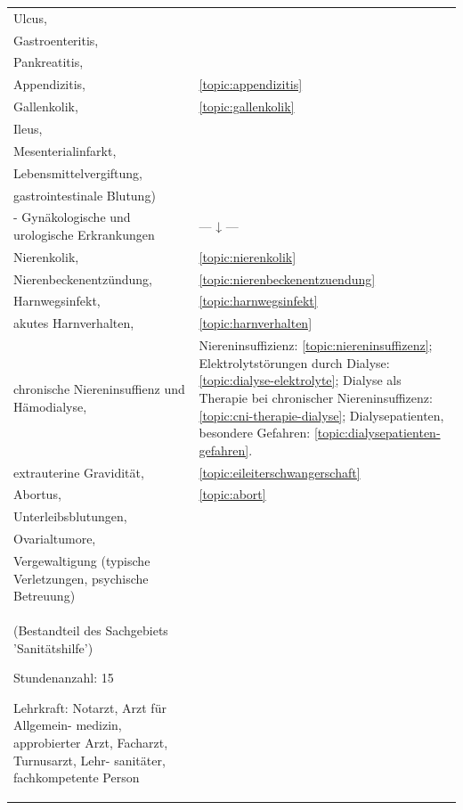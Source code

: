 \begin{xtabular}{p{10cm}p{5cm}}
Ulcus, & \noindent{}
\\
Gastroenteritis,
& 
\noindent{}
\\
Pankreatitis,
& 
\noindent{}
\\
Appendizitis,
& 
\ref{topic:appendizitis}
\\
Gallenkolik, 
& 
\ref{topic:gallenkolik}
\\
Ileus,
& 
\noindent{}
\\
Mesenterialinfarkt,
& 
\noindent{}
\\
Lebensmittelvergiftung,
& 
\noindent{}
\\
gastrointestinale Blutung)
& 
\noindent{}
\\
- Gynäkologische und urologische Erkrankungen
& 
--- ↓ --- 
\\
Nierenkolik,
& 
\ref{topic:nierenkolik}
\\
Nierenbeckenentzündung,
& 
\ref{topic:nierenbeckenentzuendung}
\\
Harnwegsinfekt, 
& 
\ref{topic:harnwegsinfekt}
\\
akutes Harnverhalten,
& 
\ref{topic:harnverhalten}
\\
chronische Niereninsuffienz und Hämodialyse,
& 
Niereninsuffizienz: \ref{topic:niereninsuffizenz}; Elektrolytstörungen durch
Dialyse: \ref{topic:dialyse-elektrolyte}; Dialyse als Therapie bei chronischer
Niereninsuffizenz: \ref{topic:cni-therapie-dialyse}; Dialysepatienten, besondere
Gefahren: \ref{topic:dialysepatienten-gefahren}.
\\
extrauterine Gravidität, 
& 
\ref{topic:eileiterschwangerschaft}
\\
Abortus,
& 
\ref{topic:abort}
\\
Unterleibsblutungen,
& 
\noindent{}
\\
Ovarialtumore,
& 
\noindent{}
\\
Vergewaltigung (typische Verletzungen, psychische Betreuung)
& 
\noindent{}
\\\toprule
{}  

(Bestandteil des Sachgebiets  'Sanitätshilfe')  

\begin{inparadesc}
\item[Stundenanzahl:]  15  
\item[Lehrkraft:]   Notarzt, Arzt für  Allgemein-  medizin,  approbierter 
Arzt, Facharzt,   Turnusarzt,  Lehr-  sanitäter,  fachkompetente Person
\end{inparadesc}


\end{xtabular}
